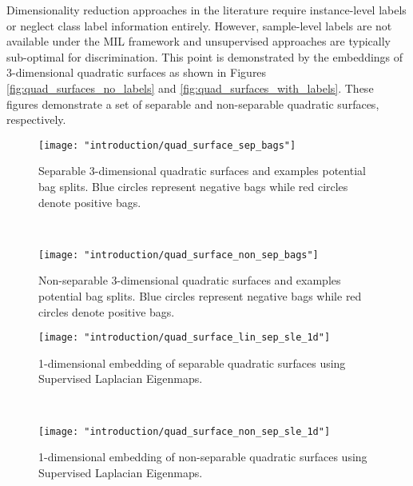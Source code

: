 Dimensionality reduction approaches in the literature require instance-level labels or neglect class label information entirely. However, sample-level labels are not available under the MIL framework and unsupervised approaches are typically sub-optimal for discrimination.  This point is demonstrated by the embeddings of 3-dimensional quadratic surfaces as shown in Figures \ref{fig:quad_surfaces_no_labels} and \ref{fig:quad_surfaces_with_labels}.  These figures demonstrate a set of separable and non-separable quadratic surfaces, respectively. 
 \begin{figure*}[t!]
 	\centering
 	\begin{subfigure}[t]{0.5\textwidth}
 		\centering
 		\texttt{[image: "introduction/quad\_surface\_sep\_bags"]}
 		\caption{Separable 3-dimensional quadratic surfaces and examples potential bag splits.  Blue circles represent negative bags while red circles denote positive bags.}
 		\label{fig:quad_surface_sep_bags}
 	\end{subfigure}%
 	~ 
 	\begin{subfigure}[t]{0.5\textwidth}
 		\centering
 		\texttt{[image: "introduction/quad\_surface\_non\_sep\_bags"]}
 		\caption{Non-separable 3-dimensional quadratic surfaces and examples potential bag splits. Blue circles represent negative bags while red circles denote positive bags.}
 		\label{fig:quad_surface_non_sep_bags}
 	\end{subfigure}
 	
 	
 	\begin{subfigure}[t]{0.5\textwidth}
 		\centering
 		\texttt{[image: "introduction/quad\_surface\_lin\_sep\_sle\_1d"]}
 		\caption{1-dimensional embedding of separable quadratic surfaces using Supervised Laplacian Eigenmaps.}
 		\label{fig:quad_surface_lin_sep_sle_1d}
 	\end{subfigure}%
 	~ 
 	\begin{subfigure}[t]{0.5\textwidth}
 		\centering
 		\texttt{[image: "introduction/quad\_surface\_non\_sep\_sle\_1d"]}
 		\caption{1-dimensional embedding of non-separable quadratic surfaces using Supervised Laplacian Eigenmaps.}
 		\label{fig:quad_surface_non_sep_sle_1d}
 	\end{subfigure}
 	\caption[Supervised embedding of quadratic surfaces]{Embedding of quadratic surfaces using Supervised Laplacian Eigenmaps.}
 	\label{fig:quad_surfaces_with_labels}%
 \end{figure*} 
